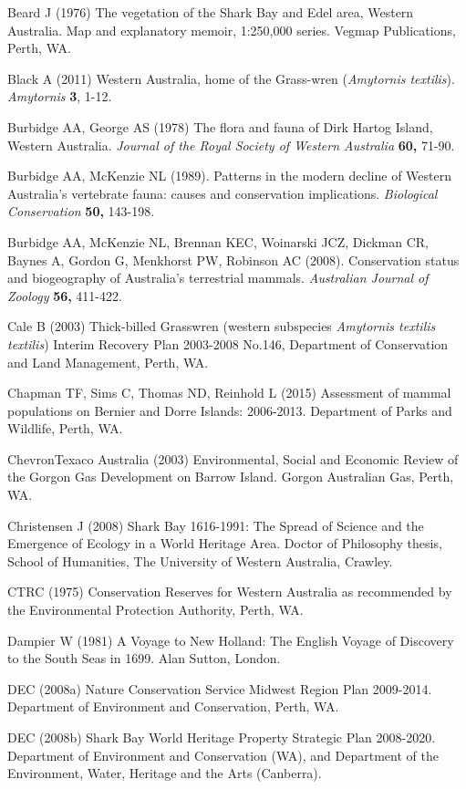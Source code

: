 \documentclass[version=last,
    paper=a4,                               %
    10pt,                                   %
    dvipsnames,
    oneside,                              %
    headings=openany,                       %
    open=any,
    BCOR=7mm,                               %
    DIV=15,     %
]{scrbook}
\begin{document}
Beard J (1976) The vegetation of the Shark Bay and Edel area, Western
Australia. Map and explanatory memoir, 1:250,000 series. Vegmap
Publications, Perth, WA.

Black A (2011) Western Australia, home of the Grass-wren
(\emph{Amytornis textilis}). \emph{Amytornis} \textbf{3}, 1-12.

Burbidge AA, George AS (1978) The flora and fauna of Dirk Hartog Island,
Western Australia. \emph{Journal of the Royal Society of Western
Australia} \textbf{60,} 71-90.

Burbidge AA, McKenzie NL (1989). Patterns in the modern decline of
Western Australia's vertebrate fauna: causes and conservation
implications. \emph{Biological Conservation} \textbf{50,} 143-198.

Burbidge AA, McKenzie NL, Brennan KEC, Woinarski JCZ, Dickman CR, Baynes
A, Gordon G, Menkhorst PW, Robinson AC (2008). Conservation status and
biogeography of Australia's terrestrial mammals. \emph{Australian
Journal of Zoology} \textbf{56,} 411-422.

Cale B (2003) Thick-billed Grasswren (western subspecies \emph{Amytornis
textilis textilis}) Interim Recovery Plan 2003-2008 No.146, Department
of Conservation and Land Management, Perth, WA.

Chapman TF, Sims C, Thomas ND, Reinhold L (2015) Assessment of mammal
populations on Bernier and Dorre Islands: 2006-2013. Department of Parks
and Wildlife, Perth, WA.

ChevronTexaco Australia (2003) Environmental, Social and Economic Review
of the Gorgon Gas Development on Barrow Island. Gorgon Australian Gas,
Perth, WA.

Christensen J (2008) Shark Bay 1616-1991: The Spread of Science and the
Emergence of Ecology in a World Heritage Area. Doctor of Philosophy
thesis, School of Humanities, The University of Western Australia,
Crawley.

CTRC (1975) Conservation Reserves for Western Australia as recommended
by the Environmental Protection Authority, Perth, WA.

Dampier W (1981) A Voyage to New Holland: The English Voyage of
Discovery to the South Seas in 1699. Alan Sutton, London.

DEC (2008a) Nature Conservation Service Midwest Region Plan 2009-2014.
Department of Environment and Conservation, Perth, WA.

DEC (2008b) Shark Bay World Heritage Property Strategic Plan 2008-2020.
Department of Environment and Conservation (WA), and Department of the
Environment, Water, Heritage and the Arts (Canberra).
\end{document}
